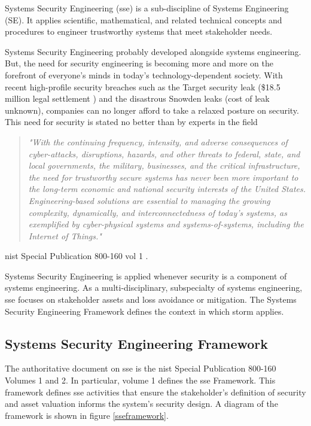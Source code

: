 \documentclass[../../main/main.tex]{subfiles}
\begin{document}
Systems Security Engineering (\gls{sse}) is a sub-discipline of Systems Engineering (SE).  It applies scientific, mathematical, and related technical concepts and procedures to engineer trustworthy systems that meet stakeholder needs. 

Systems Security Engineering probably developed alongside systems engineering.  But, the need for security engineering is becoming more and more on the forefront of everyone's minds in today's technology-dependent society.  With recent high-profile security breaches such as the Target  security leak (\$18.5 million legal settlement \cite{target}) and the disastrous Snowden leaks (cost of leak unknown), companies can no longer afford to take a relaxed posture on security.  This need for security is stated no better than by experts in the field

\begin{quote}
\textit{"With the continuing frequency, intensity, and adverse consequences of cyber-attacks, disruptions, hazards, and other threats to federal, state, and local governments, the military, businesses, and the critical infrastructure, the need for trustworthy secure systems has never been more important to the long-term economic and national security interests of the United States. Engineering-based solutions are essential to managing the growing complexity, dynamically, and interconnectedness of today's systems, as exemplified by cyber-physical systems and systems-of-systems, including the Internet of Things."}  \cite{NIST800160}
\end{quote} \begin{flushright}\gls{nist} Special Publication 800-160 vol 1 \cite{NIST800160}.\end{flushright}


Systems Security Engineering is applied whenever security is a component of systems engineering.  As a multi-disciplinary, subspecialty of systems engineering, \gls{sse} focuses on stakeholder assets and loss avoidance or mitigation.  The Systems Security Engineering Framework defines the context in which \gls{storm} applies.
   
\subsection{Systems Security Engineering Framework}
The authoritative document on \gls{sse} is the \gls{nist} Special Publication 800-160 Volumes 1 and 2.  In particular, volume 1 defines the \gls{sse} Framework.  This framework defines \gls{sse} activities that ensure the stakeholder's definition of security and asset valuation informs the system's security design.  A diagram of the framework is shown in figure \ref{sseframework}.
\end{document}
